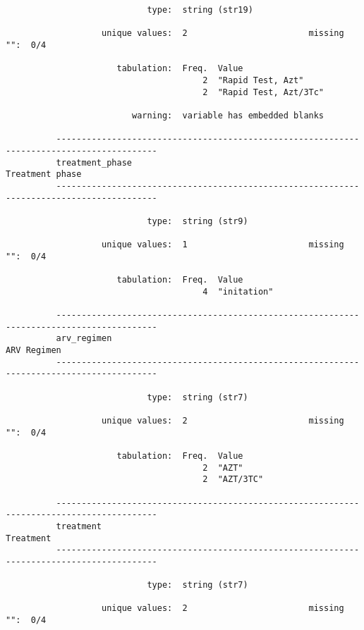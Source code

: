 \documentclass{article}
\begin{document}
\begin{verbatim}
                            type:  string (str19)
          
                   unique values:  2                        missing "":  0/4
          
                      tabulation:  Freq.  Value
                                       2  "Rapid Test, Azt"
                                       2  "Rapid Test, Azt/3Tc"
          
                         warning:  variable has embedded blanks
          
          ------------------------------------------------------------------------------------------
          treatment_phase                                                            Treatment phase
          ------------------------------------------------------------------------------------------
          
                            type:  string (str9)
          
                   unique values:  1                        missing "":  0/4
          
                      tabulation:  Freq.  Value
                                       4  "initation"
          
          ------------------------------------------------------------------------------------------
          arv_regimen                                                                    ARV Regimen
          ------------------------------------------------------------------------------------------
          
                            type:  string (str7)
          
                   unique values:  2                        missing "":  0/4
          
                      tabulation:  Freq.  Value
                                       2  "AZT"
                                       2  "AZT/3TC"
          
          ------------------------------------------------------------------------------------------
          treatment                                                                        Treatment
          ------------------------------------------------------------------------------------------
          
                            type:  string (str7)
          
                   unique values:  2                        missing "":  0/4
          

\end{verbatim}
\end{document}
